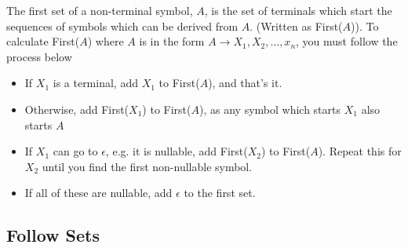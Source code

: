 The first set of a non-terminal symbol, $A$, is the set of terminals which start the sequences of symbols which can be
 derived from $A$. (Written as First($A$)). To calculate First($A$) where $A$ is in the form
 $A \rightarrow X_1, X_2, \dots, x_n$, you must follow the process below
\begin{itemize}
  \item If $X_1$ is a terminal, add $X_1$ to First($A$), and that's it.
  \item Otherwise, add First($X_1$) to First($A$), as any symbol which starts $X_1$ also starts $A$
  \item If $X_1$ can go to $\epsilon$, e.g. it is nullable, add First($X_2$) to First($A$). Repeat this for $X_2$ until
   you find the first non-nullable symbol.
  \item If all of these are nullable, add $\epsilon$ to the first set.
\end{itemize}

\subsection*{Follow Sets}


